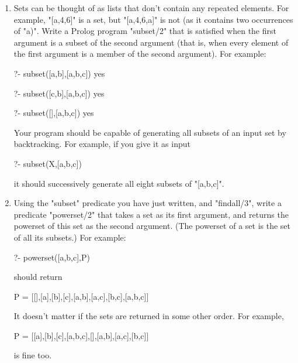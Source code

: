 \begin{enumerate}
\item{}Sets can be thought of as lists that don't contain any repeated
elements.  For example, "[a,4,6]" is a set, but "[a,4,6,a]"
is not (as it contains two occurrences of "a)". Write a Prolog
program "subset/2" that  is satisfied when the first
argument is a subset of the second argument (that is, when every
element of the first argument is a member of the second argument).
For example:
\begin{LPNcodedisplay}
?- subset([a,b],[a,b,c])
yes

?- subset([c,b],[a,b,c])
yes

?- subset([],[a,b,c])
yes
\end{LPNcodedisplay}

Your program should be capable of generating all subsets of an input set by
backtracking.  For example, if you give it as input
\begin{LPNcodedisplay}
?- subset(X,[a,b,c])
\end{LPNcodedisplay}
it should successively generate all eight subsets of "[a,b,c]".
\item{}Using the "subset" predicate you have just written, and
"findall/3", write a predicate "powerset/2" that takes a
set as its first argument, and returns the powerset of this set as the
second argument.  (The powerset of a set is the set of all its
subsets.) For example:
\begin{LPNcodedisplay}
?- powerset([a,b,c],P)
\end{LPNcodedisplay}
should return
\begin{LPNcodedisplay}
P = [[],[a],[b],[c],[a,b],[a,c],[b,c],[a,b,c]]
\end{LPNcodedisplay}
It doesn't matter if the sets are returned in some other
order. For example,
\begin{LPNcodedisplay}
P = [[a],[b],[c],[a,b,c],[],[a,b],[a,c],[b,c]]
\end{LPNcodedisplay}
is fine too.
\end{enumerate}

